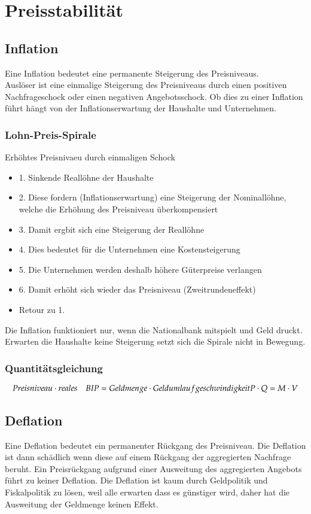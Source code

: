 \section{Preisstabilität}
\subsection{Inflation}
Eine Inflation bedeutet eine permanente Steigerung des Preisniveaus.\\
Auslöser ist eine einmalige Steigerung des Preisniveaus durch einen positiven Nachfrageschock oder einen negativen Angebotsschock. Ob dies zu einer Inflation führt hängt von der Inflationserwartung der Haushalte und Unternehmen. 
\subsubsection{Lohn-Preis-Spirale}
Erhöhtes Preisnivaeu durch einmaligen Schock
\begin{itemize}
	\item 1. Sinkende Reallöhne der Haushalte
	\item 2. Diese fordern (Inflationserwartung) eine Steigerung der Nominallöhne, welche die Erhöhung des Preisniveau überkompensiert
	\item 3. Damit ergbit sich eine Steigerung der Reallöhne
	\item 4. Dies bedeutet für die Unternehmen eine Kostensteigerung
	\item 5. Die Unternehmen werden deshalb höhere Güterpreise verlangen
	\item 6. Damit erhöht sich wieder das Preisniveau (Zweitrundeneffekt)
	\item Retour zu 1.
\end{itemize}
Die Inflation funktioniert nur, wenn die Nationalbank mitspielt und Geld druckt. Erwarten die Haushalte keine Steigerung setzt sich die Spirale nicht in Bewegung. 
\subsubsection{Quantitätsgleichung}
\begin{equation*}
	Preisniveau \cdot reales\quad BIP = Geldmenge \cdot Geldumlaufgeschwindigkeit \\
	P \cdot Q = M \cdot V
\end{equation*}
\subsection{Deflation}
Eine Deflation bedeutet ein permanenter Rückgang des Preisniveau. 
Die Deflation ist dann schädlich wenn diese auf einem Rückgang der aggregierten Nachfrage beruht. Ein Preisrückgang aufgrund einer Ausweitung des aggregierten Angebots führt zu keiner Deflation. Die Deflation ist kaum durch Geldpolitik und Fiskalpolitik zu lösen, weil alle erwarten dass es günstiger wird, daher hat die Ausweitung der Geldmenge keinen Effekt. 